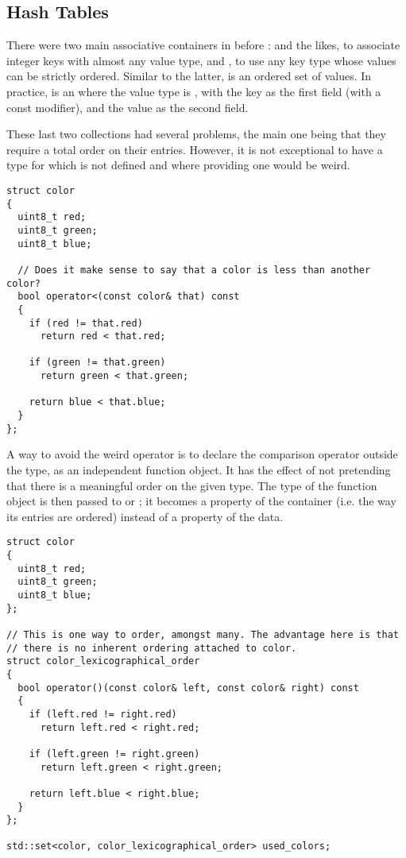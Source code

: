 \subsection{Hash Tables}

There were two main associative containers in \cpp{} before :
 and the likes, to associate integer keys with
almost any value type, and , to use any key type whose
values can be strictly ordered. Similar to the latter, 
is an ordered set of values. In practice,  is an
 where the value type is , with the key
as the first field (with a const modifier), and the value as the
second field.

These last two collections had several problems, the main one being
that they require a total order on their entries. However, it is not
exceptional to have a type for which  is not defined
and where providing one would be weird.

\begin{lstlisting}
struct color
{
  uint8_t red;
  uint8_t green;
  uint8_t blue;

  // Does it make sense to say that a color is less than another color?
  bool operator<(const color& that) const
  {
    if (red != that.red)
      return red < that.red;

    if (green != that.green)
      return green < that.green;

    return blue < that.blue;
  }
};
\end{lstlisting}

A way to avoid the weird operator is to declare the comparison
operator outside the type, as an independent function object. It has
the effect of not pretending that there is a meaningful order on the
given type. The type of the function object is then passed to
 or ; it becomes a property of the
container (i.e. the way its entries are ordered) instead of a property
of the data.

\begin{lstlisting}
struct color
{
  uint8_t red;
  uint8_t green;
  uint8_t blue;
};

// This is one way to order, amongst many. The advantage here is that
// there is no inherent ordering attached to color.
struct color_lexicographical_order
{
  bool operator()(const color& left, const color& right) const
  {
    if (left.red != right.red)
      return left.red < right.red;

    if (left.green != right.green)
      return left.green < right.green;

    return left.blue < right.blue;
  }
};

std::set<color, color_lexicographical_order> used_colors;
\end{lstlisting}

